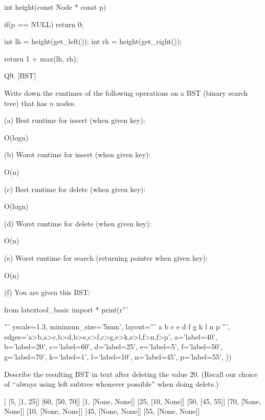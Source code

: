 \ANSWER
\begin{answercode}
int height(const Node * const p)
{
  if(p == NULL) return 0;

  int lh = height(get_left());
  int rh = height(get_right());

  return 1 + max(lh, rh);
}
\end{answercode}




\newpage
Q9. [BST]

Write down the runtimes of the following operations on a BST
(binary search tree) that has $n$ nodes.

(a) Best runtime for insert (when given key):
\\
\ANSWER
\begin{answerlong}
O(logn)
\end{answerlong}

(b) Worst runtime for insert (when given key):
\\
\ANSWER
\begin{answerlong}
O(n)
\end{answerlong}

(c) Best runtime for delete (when given key): 
\\
\ANSWER
\begin{answerlong}
O(logn)
\end{answerlong}

(d) Worst runtime for delete (when given key):
\\
\ANSWER
\begin{answerlong}
O(n)
\end{answerlong}

(e) Worst runtime for search (returning pointer when given key):
\\
\ANSWER
\begin{answerlong}
O(n)
\end{answerlong}

(f) You are given this BST:
\begin{python}
from latextool_basic import *
print(r'''
\begin{center}
\end{center}
''' %
        yscale=1.3,
        minimum_size='5mm',
        layout='''
           a
         b   c  
        e d f g 
       k l n p 
        ''',
        edges='a>b,a>c,b>d,b>e,c>f,c>g,e>k,e>l,f>n,f>p',
        a='label=40',
        b='label=20',
        c='label=60',
        d='label=25',
        e='label=5',
        f='label=50',
        g='label=70',
        k='label=1',
        l='label=10',
        n='label=45',
        p='label=55',
        ))
\end{python}
Describe the resulting BST in text after deleting the value 20.
(Recall our choice of \lq\lq always using left subtree whenever possible''
when doing delete.)
\\
\ANSWER
\begin{answercode}
[40, [5, 60]]
[5, [1, 25]]
[60, [50, 70]]
[1, [None, None]]
[25, [10, None]]
[50, [45, 55]]
[70, [None, None]]
[10, [None, None]]
[45, [None, None]]
[55, [None, None]]
\end{answercode}




